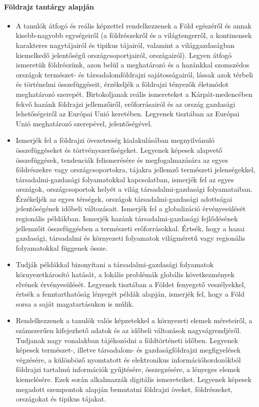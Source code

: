 \paragraph{Földrajz tantárgy alapján}
\begin{itemize}
\item A tanulók átfogó és reális képzettel rendelkezzenek a Föld egészéről és annak kisebb-nagyobb egységeiről (a földrészekről és a világtengerről, a kontinensek karakteres nagytájairól és tipikus tájairól, valamint a világgazdaságban kiemelkedő jelentőségű országcsoportjairól, országairól). Legyen átfogó ismeretük földrészünk, azon belül a meghatározó és a hazánkkal szomszédos országok természet- és társadalomföldrajzi sajátosságairól, lássak azok térbeli és történelmi összefüggéseit, érzékeljék a földrajzi tényezők életmódot meghatározó szerepét. Birtokoljanak reális ismereteket a Kárpát-medencében fekvő hazánk földrajzi jellemzőiről, erőforrásairól és az ország gazdasági lehetőségeiről az Európai Unió keretében. Legyenek tisztában az Európai Unió meghatározó szerepével, jelentőségével.
\item Ismerjék fel a földrajzi övezetesség kialakulásában megnyilvánuló összefüggéseket és törtvényszerűségeket. Legyenek képesek alapvető összefüggések, tendenciák felismerésére és megfogalmazására az egyes földrészekre vagy országcsoportokra, tájakra jellemző természeti jelenségekkel, társadalmi-gazdasági folyamatokkal kapcsolatban, ismerjék fel az egyes országok, országcsoportok helyét a világ társadalmi-gazdasági folyamataiban. Érzékeljék az egyes térségek, országok társadalmi-gazdasági adottságai jelentőségének időbeli változásait. Ismerjék fel a globalizáció érvényesülését regionális példákban. Ismerjék hazánk társadalmi-gazdasági fejlődésének jellemzőit összefüggésben a természeti erőforrásokkal. Értsék, hogy a hazai gazdasági, társadalmi és környezeti folyamatok világméretű vagy regionális folyamatokkal függenek össze.
\item Tudják példákkal bizonyítani a társadalmi-gazdasági folyamatok környezetkárosító hatását, a lokális problémák globális következmények elvének érvényesülését. Legyenek tisztában a Földet fenyegető veszélyekkel, értsék a fenntarthatóság lényegét példák alapján, ismerjék fel, hogy a Föld sorsa a saját magatartásukon is múlik.
\item Rendelkezzenek a tanulók valós képzetekkel a környezeti elemek méreteiről, a számszerűen kifejezhető adatok és az időbeli változások nagyságrendjéről. Tudjanak nagy vonalakban tájékozódni a földtörténeti időben. Legyenek képesek természet-, illetve társadalom- és gazdaságföldrajzi megfigyelések végzésére, a különböző nyomtatott és elektronikus információhordozókból földrajzi tartalmú információk gyűjtésére, összegzésére, a lényeges elemek kiemelésére. Ezek során alkalmazzák digitális ismereteiket. Legyenek képesek megadott szempontok alapján bemutatni földrajzi öveket, földrészeket, országokat és tipikus tájakat.

\end{itemize}
